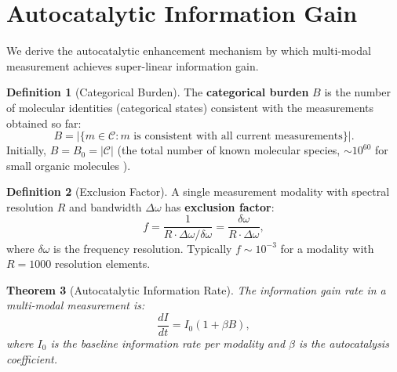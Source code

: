 \documentclass[11pt,a4paper]{article}
\newtheorem{theorem}{Theorem}[section]
\theoremstyle{definition}
\newtheorem{definition}[theorem]{Definition}
\theoremstyle{remark}
\newcommand{\Cat}{\mathcal{C}}
\begin{document}
\section{Autocatalytic Information Gain}
\label{sec:autocatalytic}

We derive the autocatalytic enhancement mechanism by which multi-modal measurement achieves super-linear information gain.

\begin{definition}[Categorical Burden]
\label{def:burden}
The \textbf{categorical burden} $B$ is the number of molecular identities (categorical states) consistent with the measurements obtained so far:
\begin{equation}
B = |\{m \in \Cat : m \text{ is consistent with all current measurements}\}|.
\end{equation}
Initially, $B = B_0 = |\Cat|$ (the total number of known molecular species, $\sim 10^{60}$ for small organic molecules \citep{kim2023}).
\end{definition}

\begin{definition}[Exclusion Factor]
\label{def:exclusion}
A single measurement modality with spectral resolution $R$ and bandwidth $\Delta\omega$ has \textbf{exclusion factor}:
\begin{equation}
f = \frac{1}{R \cdot \Delta\omega / \delta\omega} = \frac{\delta\omega}{R \cdot \Delta\omega},
\end{equation}
where $\delta\omega$ is the frequency resolution. Typically $f \sim 10^{-3}$ for a modality with $R = 1000$ resolution elements.
\end{definition}

\begin{theorem}[Autocatalytic Information Rate]
\label{thm:autocatalytic}
The information gain rate in a multi-modal measurement is:
\begin{equation}
\frac{dI}{dt} = I_0 (1 + \beta B),
\end{equation}
where $I_0$ is the baseline information rate per modality and $\beta$ is the autocatalysis coefficient.
\end{theorem}
\end{document}
